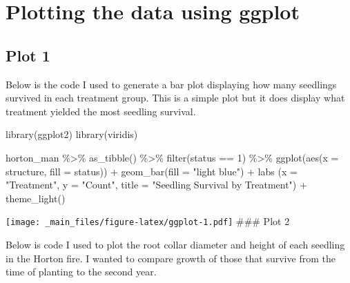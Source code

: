 \documentclass[
]{book}
\newenvironment{Shaded}{\begin{snugshade}}{\end{snugshade}}
\newcommand{\AttributeTok}[1]{\textcolor[rgb]{0.77,0.63,0.00}{#1}}
\newcommand{\DecValTok}[1]{\textcolor[rgb]{0.00,0.00,0.81}{#1}}
\newcommand{\FunctionTok}[1]{\textcolor[rgb]{0.00,0.00,0.00}{#1}}
\newcommand{\NormalTok}[1]{#1}
\newcommand{\SpecialCharTok}[1]{\textcolor[rgb]{0.00,0.00,0.00}{#1}}
\newcommand{\StringTok}[1]{\textcolor[rgb]{0.31,0.60,0.02}{#1}}
\begin{document}
\hypertarget{plotting-the-data-using-ggplot}{%
\section{Plotting the data using ggplot}\label{plotting-the-data-using-ggplot}}

\hypertarget{plot-1}{%
\subsection{Plot 1}\label{plot-1}}

Below is the code I used to generate a bar plot displaying how many seedlings
survived in each treatment group. This is a simple plot but it does display what
treatment yielded the most seedling survival.

\begin{Shaded}
\begin{Highlighting}[]
\FunctionTok{library}\NormalTok{(ggplot2)}
\FunctionTok{library}\NormalTok{(viridis)}

\NormalTok{horton\_man }\SpecialCharTok{\%\textgreater{}\%} 
  \FunctionTok{as\_tibble}\NormalTok{() }\SpecialCharTok{\%\textgreater{}\%} 
  \FunctionTok{filter}\NormalTok{(status }\SpecialCharTok{==} \DecValTok{1}\NormalTok{) }\SpecialCharTok{\%\textgreater{}\%} 
  \FunctionTok{ggplot}\NormalTok{(}\FunctionTok{aes}\NormalTok{(}\AttributeTok{x =}\NormalTok{ structure, }\AttributeTok{fill =}\NormalTok{ status)) }\SpecialCharTok{+} 
  \FunctionTok{geom\_bar}\NormalTok{(}\AttributeTok{fill =} \StringTok{"light blue"}\NormalTok{) }\SpecialCharTok{+} 
  \FunctionTok{labs}\NormalTok{ (}\AttributeTok{x =} \StringTok{"Treatment"}\NormalTok{, }\AttributeTok{y =} \StringTok{"Count"}\NormalTok{,}
        \AttributeTok{title =} \StringTok{"Seedling Survival by Treatment"}\NormalTok{) }\SpecialCharTok{+} 
  \FunctionTok{theme\_light}\NormalTok{() }
\end{Highlighting}
\end{Shaded}

\texttt{[image: \_main\_files/figure-latex/ggplot-1.pdf]}
\#\#\# Plot 2

Below is code I used to plot the root collar diameter and height of each
seedling in the Horton fire. I wanted to compare growth of those that survive
from the time of planting to the second year.
\end{document}
